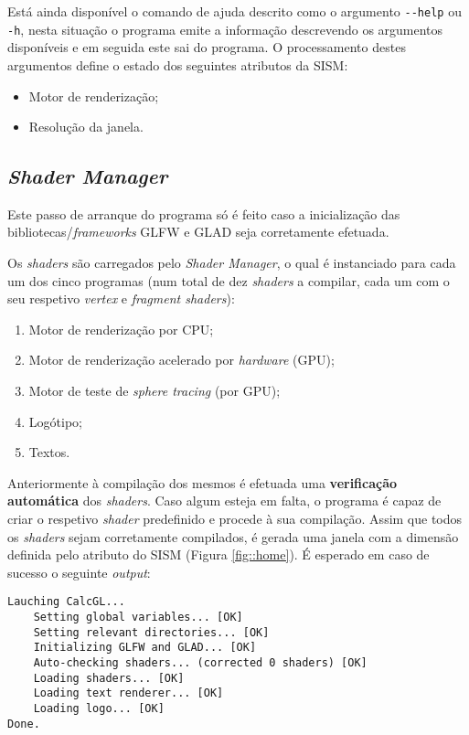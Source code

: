 Está ainda disponível o comando de ajuda descrito como o argumento \verb|--help| ou \verb|-h|, nesta situação o programa emite a informação descrevendo os argumentos disponíveis e em seguida este sai do programa.
%
O processamento destes argumentos define o estado dos seguintes atributos da \ac{SISM}:
\begin{itemize}[nosep]
    \item Motor de renderização;
    \item Resolução da janela.
\end{itemize}


\subsection{\textit{Shader Manager}}
\label{ssec::impl:estrutura:shaders}

Este passo de arranque do programa só é feito caso a inicialização das bibliotecas/\textit{frameworks} GLFW e \ac{GLAD} seja corretamente efetuada.

Os \textit{shaders} são carregados pelo \textit{Shader Manager}, o qual é instanciado para cada um dos cinco programas (num total de dez \textit{shaders} a compilar, cada um com o seu respetivo \textit{vertex} e \textit{fragment shaders}):

\begin{enumerate}[nosep]
	\item Motor de renderização por \acs{CPU};
	\item Motor de renderização acelerado por \textit{hardware} (\acs{GPU});
	\item Motor de teste de \textit{sphere tracing} (por \acs{GPU});
	\item Logótipo;
	\item Textos.
\end{enumerate}

Anteriormente à compilação dos mesmos é efetuada uma \textbf{verificação automática} dos \textit{shaders}. Caso algum esteja em falta, o programa é capaz de criar o respetivo \textit{shader} predefinido e procede à sua compilação. Assim que todos os \textit{shaders} sejam corretamente compilados, é gerada uma janela com a dimensão definida pelo atributo do \ac{SISM} (Figura \ref{fig::home}). É esperado em caso de sucesso o seguinte \textit{output}:

\begin{verbatim}
Lauching CalcGL...
    Setting global variables... [OK]
    Setting relevant directories... [OK]
    Initializing GLFW and GLAD... [OK]
    Auto-checking shaders... (corrected 0 shaders) [OK]
    Loading shaders... [OK]
    Loading text renderer... [OK]
    Loading logo... [OK]
Done.
\end{verbatim}

